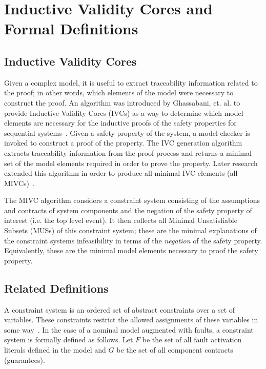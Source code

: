 \section{Inductive Validity Cores and Formal Definitions}

\subsection{Inductive Validity Cores}
Given a complex model, it is useful to extract traceability information related to the proof; in other words, which elements of the model were necessary to construct the proof. An algorithm was introduced by Ghassabani, et. al. to provide Inductive Validity Cores (IVCs) as a way to determine which model elements are necessary for the inductive proofs of the safety properties for sequential systems~\cite{GhassabaniGW16}. Given a safety property of the system, a model checker is invoked to construct a proof of the property. The IVC generation algorithm extracts traceability information from the proof process and returns a minimal set of the model elements required in order to prove the property. Later research extended this algorithm in order to produce all minimal IVC elements (all MIVCs)~\cite{Ghassabani2017EfficientGO,bendik2018online}. 

The MIVC algorithm considers a constraint system consisting of the assumptions and contracts of system components and the negation of the safety property of interest (i.e. the top level event). It then collects all Minimal Unsatisfiable Subsets (MUSs) of this constraint system; these are the minimal explanations of the constraint systems infeasibility in terms of the \textit{negation} of the safety property. Equivalently, these are the minimal model elements necessary to proof the safety property.%

\subsection{Related Definitions}
\label{sec:definitions}
A constraint system is an ordered set of abstract constraints over a set of variables. These constraints restrict the allowed assignments of these variables in some way~\cite{liffiton2016fast}. In the case of a nominal model augmented with faults, a constraint system is formally defined as follows. Let $F$ be the set of all fault activation literals defined in the model and $G$ be the set of all component contracts (guarantees). 

